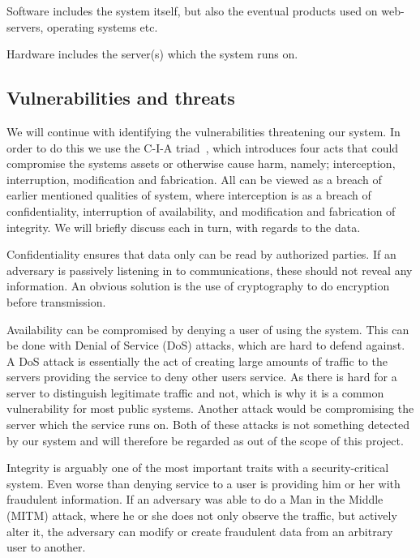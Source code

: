Software includes the system itself, but also the eventual products
used on web-servers, operating systems etc.

Hardware includes the server(s) which the system runs on.


\subsection{Vulnerabilities and threats}

We will continue with identifying the vulnerabilities threatening our
system. In order to do this we use the C-I-A triad~\cite{anderson},
which introduces four acts that could compromise the systems assets or
otherwise cause harm, namely; interception, interruption, modification
and fabrication. All can be viewed as a breach of earlier mentioned
qualities of system, where interception is as a breach of
confidentiality, interruption of availability, and modification and
fabrication of integrity. We will briefly discuss each in turn, with
regards to the data.

Confidentiality ensures that data only can be read by authorized
parties. If an adversary is passively listening in to communications,
these should not reveal any information. An obvious solution is the
use of cryptography to do encryption before transmission.

Availability can be compromised by denying a user of using the
system. This can be done with Denial of Service (DoS) attacks, which
are hard to defend against. A DoS attack is essentially the act of
creating large amounts of traffic to the servers providing the service
to deny other users service. As there is hard for a server to
distinguish legitimate traffic and not, which is why it is a common
vulnerability for most public systems. Another attack would be
compromising the server which the service runs on. Both of these
attacks is not something detected by our system and will therefore be
regarded as out of the scope of this project.

Integrity is arguably one of the most important traits with a
security-critical system. Even worse than denying service to a user is
providing him or her with fraudulent information. If an adversary was
able to do a Man in the Middle (MITM) attack, where he or she does not
only observe the traffic, but actively alter it, the adversary can
modify or create fraudulent data from an arbitrary user to another.

